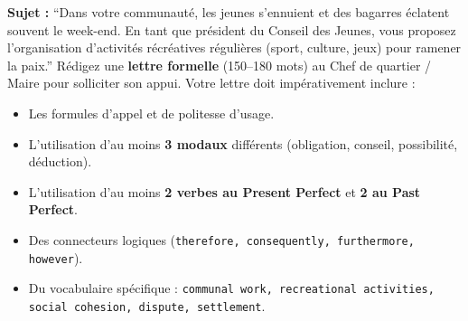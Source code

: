 \documentclass[11pt]{article}
\begin{document}
\begin{exercice}
\textbf{Sujet :} ``Dans votre communauté, les jeunes s'ennuient et des bagarres éclatent souvent le week-end. En tant que président du Conseil des Jeunes, vous proposez l'organisation d'activités récréatives régulières (sport, culture, jeux) pour ramener la paix.''
Rédigez une \textbf{lettre formelle} (150--180 mots) au Chef de quartier / Maire pour solliciter son appui. Votre lettre doit impérativement inclure :
\begin{itemize}
    \item Les formules d'appel et de politesse d'usage.
    \item L'utilisation d'au moins \textbf{3 modaux} différents (obligation, conseil, possibilité, déduction).
    \item L'utilisation d'au moins \textbf{2 verbes au Present Perfect} et \textbf{2 au Past Perfect}.
    \item Des connecteurs logiques (\texttt{therefore, consequently, furthermore, however}).
    \item Du vocabulaire spécifique : \texttt{communal work, recreational activities, social cohesion, dispute, settlement}.
\end{itemize}
\end{exercice}
\end{document}
